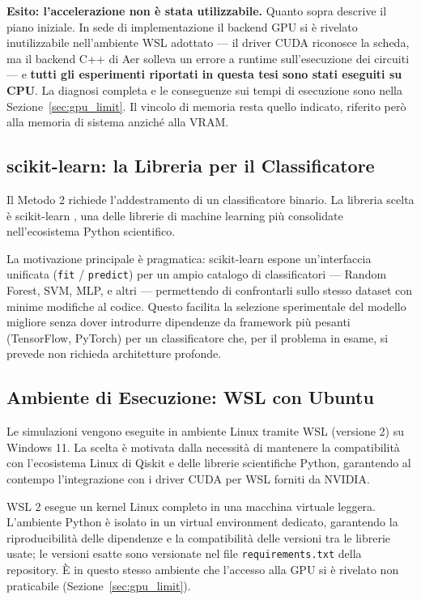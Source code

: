 \begin{onehalfspace}
\textbf{Esito: l'accelerazione non è stata utilizzabile.} Quanto sopra descrive il piano iniziale. In sede di implementazione il backend \ac{GPU} si è rivelato inutilizzabile nell'ambiente \ac{WSL} adottato --- il driver CUDA riconosce la scheda, ma il backend C++ di Aer solleva un errore a runtime sull'esecuzione dei circuiti --- e \textbf{tutti gli esperimenti riportati in questa tesi sono stati eseguiti su \ac{CPU}}. La diagnosi completa e le conseguenze sui tempi di esecuzione sono nella Sezione~\ref{sec:gpu_limit}. Il vincolo di memoria resta quello indicato, riferito però alla memoria di sistema anziché alla VRAM.

\subsection{scikit-learn: la Libreria per il Classificatore}
\label{sec:scikit}

Il Metodo 2 richiede l'addestramento di un classificatore binario. La libreria scelta è scikit-learn \cite{scikit_learn}, una delle librerie di machine learning più consolidate nell'ecosistema Python scientifico.

La motivazione principale è pragmatica: scikit-learn espone un'interfaccia unificata (\texttt{fit} / \texttt{predict}) per un ampio catalogo di classificatori — Random Forest, \ac{SVM}, \ac{MLP}, e altri — permettendo di confrontarli sullo stesso dataset con minime modifiche al codice. Questo facilita la selezione sperimentale del modello migliore senza dover introdurre dipendenze da framework più pesanti (TensorFlow, PyTorch) per un classificatore che, per il problema in esame, si prevede non richieda architetture profonde.

\subsection{Ambiente di Esecuzione: WSL con Ubuntu}
\label{sec:wsl}

Le simulazioni vengono eseguite in ambiente Linux tramite \ac{WSL} (versione 2) su Windows 11. La scelta è motivata dalla necessità di mantenere la compatibilità con l'ecosistema Linux di Qiskit e delle librerie scientifiche Python, garantendo al contempo l'integrazione con i driver CUDA per \ac{WSL} forniti da NVIDIA.

\ac{WSL} 2 esegue un kernel Linux completo in una macchina virtuale leggera. L'ambiente Python è isolato in un virtual environment dedicato, garantendo la riproducibilità delle dipendenze e la compatibilità delle versioni tra le librerie usate; le versioni esatte sono versionate nel file \texttt{requirements.txt} della repository. È in questo stesso ambiente che l'accesso alla \ac{GPU} si è rivelato non praticabile (Sezione~\ref{sec:gpu_limit}).


\end{onehalfspace}
